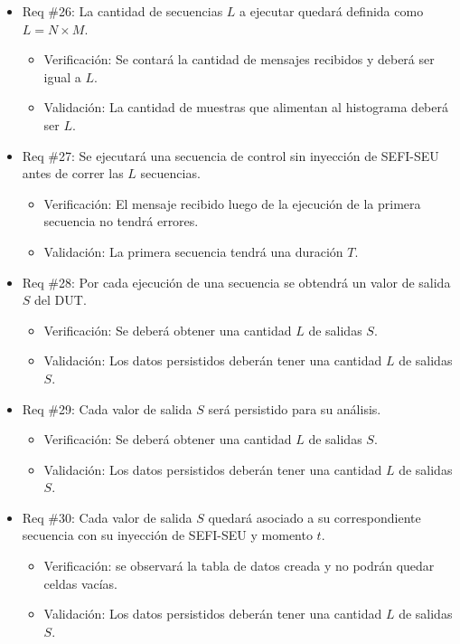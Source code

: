\documentclass[
11pt, %
]{charter}
\begin{document}
\begin{itemize}
\item Req \#26: La cantidad de secuencias $ L $ a ejecutar quedará definida como $ L = N \times M $.
\begin{itemize}
    \item Verificación: Se contará la cantidad de mensajes recibidos y deberá ser igual a $ L $.
    \item Validación: La cantidad de muestras que alimentan al histograma deberá ser $ L $.
\end{itemize}

\item Req \#27: Se ejecutará una secuencia de control sin inyección de SEFI-SEU antes de correr las $ L $ secuencias.
\begin{itemize}
    \item Verificación: El mensaje recibido luego de la ejecución de la primera secuencia no tendrá errores.
    \item Validación: La primera secuencia tendrá una duración $ T $.
\end{itemize}

\item Req \#28: Por cada ejecución de una secuencia se obtendrá un valor de salida $ S $ del DUT.
\begin{itemize}
    \item Verificación: Se deberá obtener una cantidad $ L $ de salidas $ S $.
    \item Validación: Los datos persistidos deberán tener una cantidad $ L $ de salidas $ S $.
\end{itemize}

\item Req \#29: Cada valor de salida $ S $ será persistido para su análisis.
\begin{itemize}
    \item Verificación: Se deberá obtener una cantidad $ L $ de salidas $ S $.
    \item Validación: Los datos persistidos deberán tener una cantidad $ L $ de salidas $ S $.
\end{itemize}

\item Req \#30: Cada valor de salida $ S $ quedará asociado a su correspondiente secuencia con su inyección de SEFI-SEU y momento $ t $.
\begin{itemize}
    \item Verificación: se observará la tabla de datos creada y no podrán quedar celdas vacías.
    \item Validación: Los datos persistidos deberán tener una cantidad $ L $ de salidas $ S $.
\end{itemize}


\end{itemize}
\end{document}
